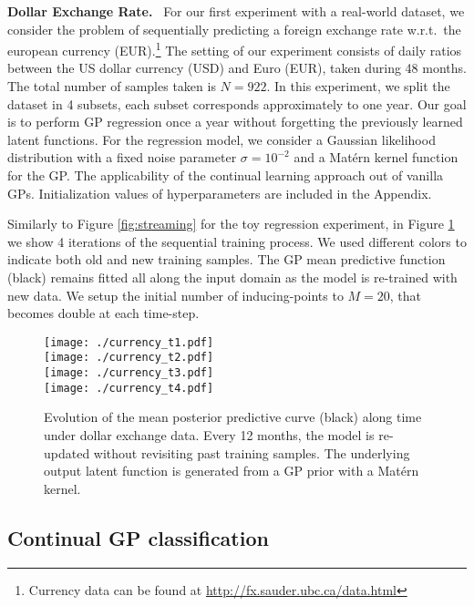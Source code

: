 \documentclass[]{article}
\begin{document}
\textbf{Dollar Exchange Rate.}~ For our first experiment with a real-world dataset, we consider the problem of sequentially predicting a foreign exchange rate w.r.t.\ the european currency (EUR).\footnote{Currency data can be found at \url{http://fx.sauder.ubc.ca/data.html}} The setting of our experiment consists of daily ratios between the US dollar currency (USD) and Euro (EUR), taken during 48 months. The total number of samples taken is $N=922$. In this experiment, we split the dataset in 4 subsets, each subset corresponds approximately to one year. Our goal is to perform GP regression once a year without forgetting the previously learned latent functions. For the regression model, we consider a Gaussian likelihood distribution with a fixed noise parameter $\sigma=10^{-2}$ and a Mat\'ern kernel function for the GP. The applicability of the continual learning approach out of vanilla GPs. Initialization values of hyperparameters are included in the Appendix. 

Similarly to Figure \ref{fig:streaming} for the toy regression experiment, in Figure \ref{fig:currency} we show 4 iterations of the sequential training process. We used different colors to indicate both old and new training samples. The GP mean predictive function (black) remains fitted all along the input domain as the model is re-trained with new data. We setup the initial number of inducing-points to $M=20$, that becomes double at each time-step.

\begin{figure}[] \centering
	\texttt{[image: ./currency\_t1.pdf]}\\
	\vspace{0.1cm}
	\texttt{[image: ./currency\_t2.pdf]}\\
	\vspace{0.1cm}
	\texttt{[image: ./currency\_t3.pdf]}\\
	\vspace{0.1cm}
	\texttt{[image: ./currency\_t4.pdf]}
	\caption{Evolution of the mean posterior predictive curve (black) along time under dollar exchange data. Every 12 months, the model is re-updated without revisiting past training samples. The underlying output latent function is generated from a GP prior with a Mat\'ern kernel.}
	\label{fig:currency}
\end{figure}

\subsection{Continual GP classification}
\label{sec:gp_class}
\end{document}
